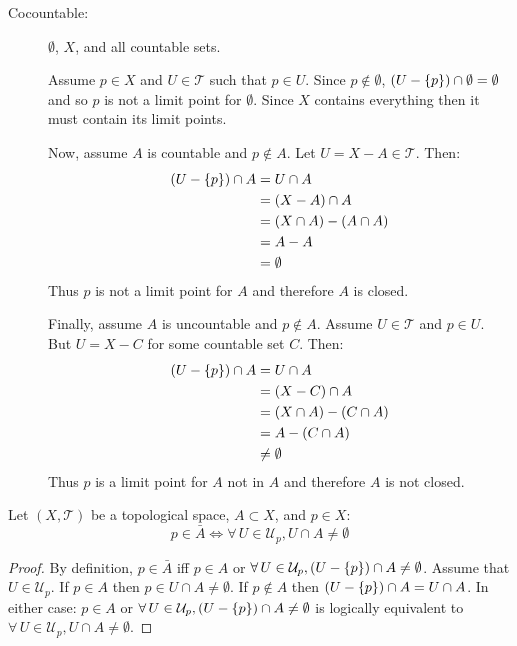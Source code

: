 \documentclass[letterpaper,12pt,fleqn]{article}
\newcommand{\T}{\mathscr{T}}
\newcommand{\U}{\mathcal{U}}
\begin{document}
\begin{example}
\begin{description}
  \item[Cocountable:] \(\emptyset\), \(X\), and all countable sets.

    Assume \(p\in X\) and \(U\in\T\) such that \(p\in U\).  Since \(p\notin\emptyset\),
    \((U-\{p\})\cap\emptyset=\emptyset\) and so \(p\) is not a limit point for \(\emptyset\).  Since \(X\)
    contains everything then it must contain its limit points.

    Now, assume \(A\) is countable and \(p\notin A\).  Let \(U=X-A\in\T\).  Then:
    \begin{align*}
      (U-\{p\})\cap A &= U\cap A \\
      &= (X-A)\cap A \\
      &= (X\cap A)-(A\cap A) \\
      &= A-A \\
      &= \emptyset
    \end{align*}
    Thus \(p\) is not a limit point for \(A\) and therefore \(A\) is closed.

    Finally, assume \(A\) is uncountable and \(p\notin A\).  Assume \(U\in\T\) and \(p\in U\).  But \(U=X-C\) for
    some countable set \(C\).  Then:
    \begin{align*}
      (U-\{p\})\cap A &= U\cap A \\
      &= (X-C)\cap A \\
      &= (X\cap A)-(C\cap A) \\
      &= A-(C\cap A) \\
      &\ne \emptyset
    \end{align*}
    Thus \(p\) is a limit point for \(A\) not in \(A\) and therefore \(A\) is not closed.
  \end{description}
\end{example}

\begin{lemma}
  Let \((X,\T)\) be a topological space, \(A\subset X\), and \(p\in X\):
  \[p\in\bar{A}\iff\forall\,U\in\U_p,U\cap A\ne\emptyset\]
\end{lemma}

\begin{proof}
  By definition, \(p\in\bar{A}\) iff \(p\in A\) or \(\forall\,U\in\U_p,(U-\set{p})\cap A\ne\emptyset\).  Assume that
  \(U\in\U_p\).  If \(p\in A\) then \(p\in U\cap A\ne\emptyset\).  If \(p\notin A\) then
  \((U-\{p\})\cap A=U\cap A\).  In either case: \(p\in A\) or \(\forall\,U\in\U_p,(U-\set{p})\cap A\ne\emptyset\)
  is logically equivalent to \(\forall\,U\in\U_p,U\cap A\ne\emptyset\).
\end{proof}
\end{document}
